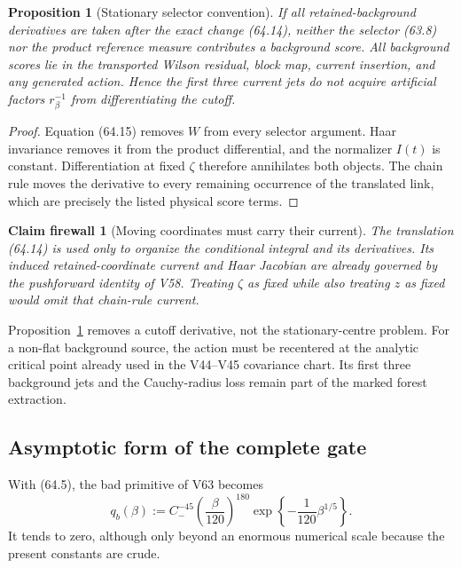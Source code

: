 \documentclass[11pt,oneside]{book}
\newtheorem{proposition}[theorem]{Proposition}
\newtheorem{firewall}[theorem]{Claim firewall}
\theoremstyle{definition}
\theoremstyle{remark}
\begin{document}
\begin{proposition}[Stationary selector convention]
\label{prop:e8v64-stationary-selector}
If all retained-background derivatives are taken after the exact
change (64.14), neither the selector (63.8) nor the product reference
measure contributes a background score.  All background scores lie
in the transported Wilson residual, block map, current insertion,
and any generated action.  Hence the first three current jets do not
acquire artificial factors \(r_\beta^{-1}\) from differentiating
the cutoff.
\end{proposition}

\begin{proof}
Equation (64.15) removes \(W\) from every selector argument.
Haar invariance removes it from the product differential, and the
normalizer \(I(t)\) is constant.  Differentiation at fixed
\(\zeta\) therefore annihilates both objects.  The chain rule moves
the derivative to every remaining occurrence of the translated
link, which are precisely the listed physical score terms.
\end{proof}

\begin{firewall}[Moving coordinates must carry their current]
\label{fire:e8v64-moving-current}
The translation (64.14) is used only to organize the conditional
integral and its derivatives.  Its induced retained-coordinate
current and Haar Jacobian are already governed by the pushforward
identity of V58.  Treating \(\zeta\) as fixed while also treating
\(z\) as fixed would omit that chain-rule current.
\end{firewall}

Proposition~\ref{prop:e8v64-stationary-selector} removes a cutoff
derivative, not the stationary-centre problem.  For a non-flat
background source, the action must be recentered at the analytic
critical point already used in the V44--V45 covariance chart.  Its
first three background jets and the Cauchy-radius loss remain part of
the marked forest extraction.

\subsection{Asymptotic form of the complete gate}

With (64.5), the bad primitive of V63 becomes
\[
 q_b(\beta):=
 C_-^{-45}\left(\frac\beta{120}\right)^{180}
 \exp\left\{-\frac1{120}\beta^{1/5}\right\}.               \tag{64.16}
\]
It tends to zero, although only beyond an enormous numerical scale
because the present constants are crude.
\end{document}
